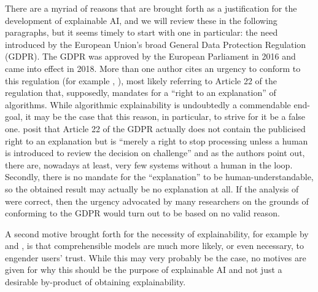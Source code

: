 There are a myriad of reasons that are brought forth as a justification for the development of explainable AI, and we will review these in the following paragraphs, but it seems timely to start with one in particular: the need introduced by the European Union's broad General Data Protection Regulation (GDPR).
The GDPR was approved by the European Parliament in 2016 and came into effect in 2018.
More than one author cites an urgency to conform to this regulation (for example \cite{doshi2017towards}, \cite{gilpin2018explaining}), most likely referring to Article 22 of the regulation that, supposedly, mandates for a \enquote{right to an explanation} of algorithms.
While algorithmic explainability is undoubtedly a commendable end-goal, it may be the case that this reason, in particular, to strive for it be a false one.
\cite{edwards2018enslaving} posit that Article 22 of the GDPR actually does not contain the publicised right to an explanation but is \enquote{merely a right to stop processing unless a human is introduced to review the decision on challenge} and as the authors point out, there are, nowadays at least, very few systems without a human in the loop.
Secondly, there is no mandate for the \enquote{explanation} to be human-understandable, so the obtained result may actually be no explanation at all.
If the analysis of \cite{edwards2018enslaving} were correct, then the urgency advocated by many researchers on the grounds of conforming to the GDPR would turn out to be based on no valid reason.

A second motive brought forth for the necessity of explainability, for example by \cite{gilpin2018explaining} and \cite{abdul2018trends}, is that comprehensible models are much more likely, or even necessary, to engender users' trust.
While this may very probably be the case, no motives are given for why this should be the purpose of explainable AI and not just a desirable by-product of obtaining explainability. 

